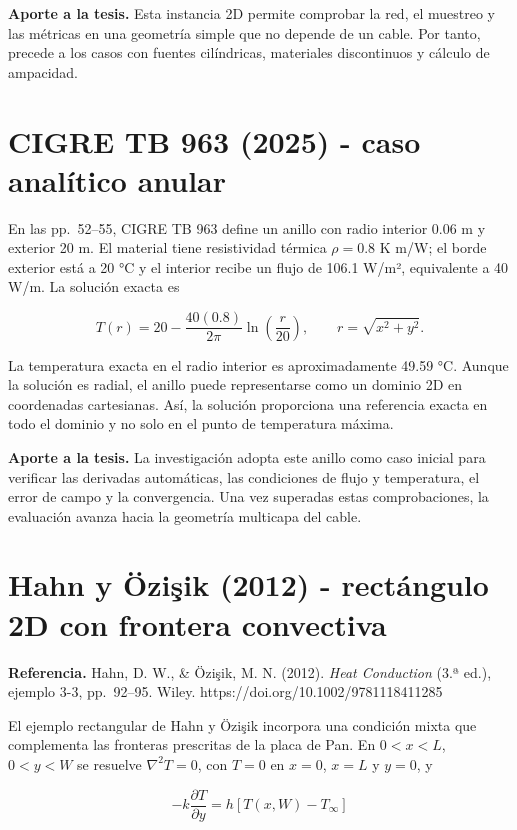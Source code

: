 \documentclass[11pt,a4paper,oneside]{report}
\begin{document}
\textbf{Aporte a la tesis.} Esta instancia 2D permite comprobar la red,
el muestreo y las métricas en una geometría simple que no depende de un
cable. Por tanto, precede a los casos con fuentes cilíndricas,
materiales discontinuos y cálculo de ampacidad.

\section{CIGRE TB 963 (2025) - caso analítico
anular}\label{cigre-tb-963-2025---caso-analuxedtico-anular}

En las pp.~52--55, CIGRE TB 963 define un anillo con radio interior 0.06
m y exterior 20 m. El material tiene resistividad térmica \(\rho=0.8\) K
m/W; el borde exterior está a 20 °C y el interior recibe un flujo de
106.1 W/m², equivalente a 40 W/m. La solución exacta es

\[
T(r)=20-\frac{40(0.8)}{2\pi}\ln\left(\frac{r}{20}\right),
\qquad r=\sqrt{x^2+y^2}.
\]

La temperatura exacta en el radio interior es aproximadamente 49.59 °C.
Aunque la solución es radial, el anillo puede representarse como un
dominio 2D en coordenadas cartesianas. Así, la solución proporciona una
referencia exacta en todo el dominio y no solo en el punto de
temperatura máxima.

\textbf{Aporte a la tesis.} La investigación adopta este anillo como
caso inicial para verificar las derivadas automáticas, las condiciones
de flujo y temperatura, el error de campo y la convergencia. Una vez
superadas estas comprobaciones, la evaluación avanza hacia la geometría
multicapa del cable.

\section{Hahn y Özişik (2012) - rectángulo 2D con frontera
convectiva}\label{hahn-y-uxf6ziux15fik-2012---rectuxe1ngulo-2d-con-frontera-convectiva}

\textbf{Referencia.} Hahn, D. W., \& Özişik, M. N. (2012). \emph{Heat
Conduction} (3.ª ed.), ejemplo 3-3, pp.~92--95. Wiley.
https://doi.org/10.1002/9781118411285

El ejemplo rectangular de Hahn y Özişik incorpora una condición mixta
que complementa las fronteras prescritas de la placa de Pan. En
\(0<x<L\), \(0<y<W\) se resuelve \(\nabla^2T=0\), con \(T=0\) en
\(x=0\), \(x=L\) y \(y=0\), y

\[
-k\frac{\partial T}{\partial y}=h[T(x,W)-T_\infty]
\]
\end{document}
